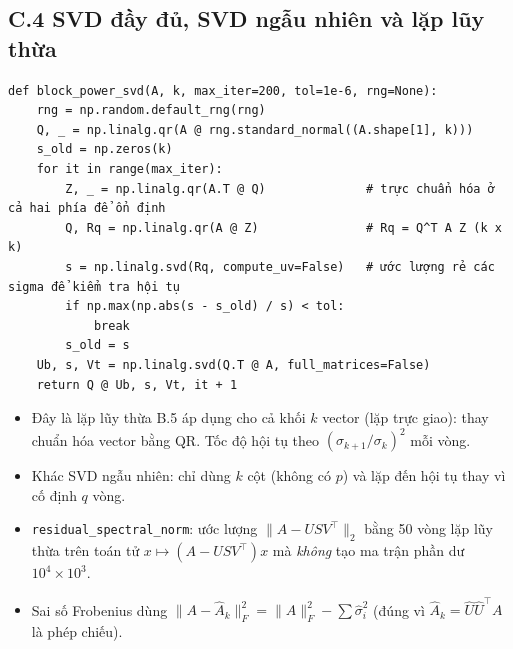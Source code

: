 \documentclass[11pt,a4paper]{article}
\newcommand{\code}[1]{\texttt{#1}}
\begin{document}
\subsection{C.4 SVD đầy đủ, SVD ngẫu nhiên và lặp lũy thừa}
\begin{verbatim}
def block_power_svd(A, k, max_iter=200, tol=1e-6, rng=None):
    rng = np.random.default_rng(rng)
    Q, _ = np.linalg.qr(A @ rng.standard_normal((A.shape[1], k)))
    s_old = np.zeros(k)
    for it in range(max_iter):
        Z, _ = np.linalg.qr(A.T @ Q)              # trực chuẩn hóa ở cả hai phía để ổn định
        Q, Rq = np.linalg.qr(A @ Z)               # Rq = Q^T A Z (k x k)
        s = np.linalg.svd(Rq, compute_uv=False)   # ước lượng rẻ các sigma để kiểm tra hội tụ
        if np.max(np.abs(s - s_old) / s) < tol:
            break
        s_old = s
    Ub, s, Vt = np.linalg.svd(Q.T @ A, full_matrices=False)
    return Q @ Ub, s, Vt, it + 1
\end{verbatim}
\begin{itemize}
\item Đây là lặp lũy thừa B.5 áp dụng cho cả khối $k$ vector (lặp trực giao): thay chuẩn hóa vector bằng QR. Tốc độ hội tụ theo $(\sigma_{k+1}/\sigma_k)^2$ mỗi vòng.
\item Khác SVD ngẫu nhiên: chỉ dùng $k$ cột (không có $p$) và lặp đến hội tụ thay vì cố định $q$ vòng.
\item \code{residual\_spectral\_norm}: ước lượng $\|A-USV^\top\|_2$ bằng 50 vòng lặp lũy thừa trên toán tử $x\mapsto(A-USV^\top)x$ mà \emph{không} tạo ma trận phần dư $10^4\times10^3$.
\item Sai số Frobenius dùng $\|A-\hat A_k\|_F^2=\|A\|_F^2-\sum\hat\sigma_i^2$ (đúng vì $\hat A_k=\hat U\hat U^\top A$ là phép chiếu).
\end{itemize}
\end{document}
